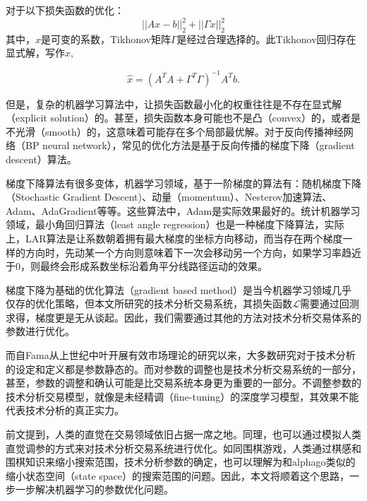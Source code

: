 \documentclass[twoside,longtitle]{LZUthesis}
\begin{document}
对于以下损失函数的优化：
\begin{equation}
||Ax-b||_2^2 + ||\Gamma x||_2^2
\end{equation}
其中，$x$是可变的系数，Tikhonov矩阵$\Gamma$是经过合理选择的。此Tikhonov回归存在显式解，写作$\hat{x}$,

\begin{equation}
\hat{x}=(A^{T}A+\Gamma^{T}\Gamma)^{-1}A^{T}b.
\end{equation}

但是，复杂的机器学习算法中，让损失函数最小化的权重往往是不存在显式解（explicit solution）的。甚至，损失函数本身可能也不是凸（convex）的，或者是不光滑（smooth）的，这意味着可能存在多个局部最优解。对于反向传播神经网络（BP neural network），常见的优化方法是基于反向传播的梯度下降（gradient descent）算法。

梯度下降算法有很多变体，机器学习领域，基于一阶梯度的算法有：随机梯度下降（Stochastic Gradient Descent)、动量（momentum）、Nesterov加速算法、Adam、AdaGradient等等。这些算法中，Adam是实际效果最好的\cite{Kingma2014Adam}\cite{Nesterov2017Efficiency}。统计机器学习领域，最小角回归算法（least angle regression）也是一种梯度下降算法\cite{Tibshirani2004Least}，实际上，LAR算法是让系数朝着拥有最大梯度的坐标方向移动，而当存在两个梯度一样的方向时，先动某一个方向则意味着下一次会移动另一个方向，如果学习率趋近于0，则最终会形成系数坐标沿着角平分线路径运动的效果。

梯度下降为基础的优化算法（gradient based method）是当今机器学习领域几乎仅存的优化策略，但本文所研究的技术分析交易系统，其损失函数$\mathcal{L}$需要通过回测求得，梯度更是无从谈起。因此，我们需要通过其他的方法对技术分析交易体系的参数进行优化。

而自Fama\cite{Malkiel1970EFFICIENT}从上世纪中叶开展有效市场理论的研究以来，大多数研究对于技术分析的设定和定义都是参数静态的。而对参数的调整也是技术分析交易系统的一部分，甚至，参数的调整和确认可能是比交易系统本身更为重要的一部分。不调整参数的技术分析交易模型，就像是未经精调（fine-tuning）的深度学习模型，其效果不能代表技术分析的真正实力。

前文提到，人类的直觉在交易领域依旧占据一席之地。同理，也可以通过模拟人类直觉调参的方式来对技术分析交易系统进行优化。如同围棋游戏，人类通过棋感和围棋知识来缩小搜索范围，技术分析参数的确定，也可以理解为和alphago\cite{Silver2017Mastering}类似的缩小状态空间（state space）的搜索范围的问题。因此，本文将顺着这个思路，一步一步解决机器学习的参数优化问题。
\end{document}
